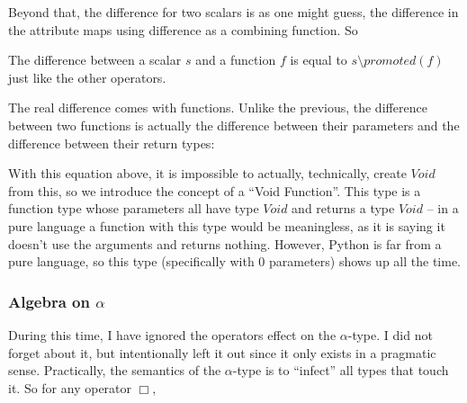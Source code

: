 \documentclass{scrartcl}
\begin{document}
\begin{multicols}{2}

Beyond that, the difference for two scalars is as one might guess,
the difference in the attribute maps using difference as a combining
function. So


The difference between a scalar $s$ and a function $f$ is equal
to $s\setminus promoted(f)$ just like the other operators.

The real difference comes with functions. Unlike the previous,
the difference between two functions is actually the difference
between their parameters and the difference between their return
types:


With this equation above, it is impossible to actually, technically,
create $Void$ from this, so we introduce the concept of a ``Void Function''.
This type is a function type whose parameters all have type $Void$ and returns
a type $Void$ -- in a pure language a function with this type would be meaningless,
as it is saying it doesn't use the arguments and returns nothing. However,
Python is far from a pure language, so this type (specifically with 0 parameters) shows
up all the time.

\subsubsection*{Algebra on $\alpha$}

During this time, I have ignored the operators effect on the $\alpha$-type.
I did not forget about it, but intentionally left it out since it only exists
in a pragmatic sense. Practically, the semantics of the $\alpha$-type is to
``infect'' all types that touch it. So for any operator $\Box$,


\end{multicols}
\end{document}

